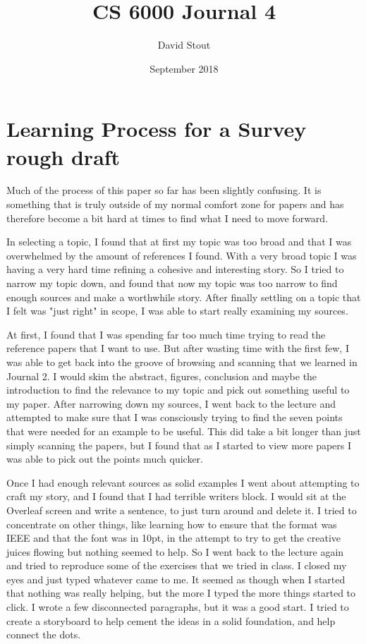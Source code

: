 \documentclass[10pt]{IEEEtran}
\title{CS 6000 Journal 4}
\author{David Stout}
\date{September 2018}
\begin{document}
\maketitle

\section{Learning Process for a Survey rough draft}
Much of the process of this paper so far has been slightly confusing. It is something that 
is truly outside of my normal comfort zone for papers and has therefore become a bit hard at
times to find what I need to move forward.

In selecting a topic, I found that at first my topic was too broad and that I was 
overwhelmed by the amount of references I found. With a very broad topic I was having a very
hard time refining a cohesive and interesting story. So I tried to narrow my topic down, and
found that now my topic was too narrow to find enough sources and make a worthwhile story. 
After finally settling on a topic that I felt was "just right" in scope, I was able to start
really examining my sources.

At first, I found that I was spending far too much time trying to read the reference papers 
that I want to use. But after wasting time with the first few, I was able to get back into 
the groove of browsing and scanning that we learned in Journal 2. I would skim the abstract,
figures, conclusion and maybe the introduction to find the relevance to my topic and pick 
out something useful to my paper. After narrowing down my sources, I went back to the 
lecture and attempted to make sure that I was consciously trying to find the seven points 
that were needed for an example to be useful. This did take a bit longer than just simply 
scanning the papers, but I found that as I started to view more papers I was able to pick 
out the points much quicker.

Once I had enough relevant sources as solid examples I went about attempting to craft my 
story, and I found that I had terrible writers block. I would sit at the Overleaf screen and
write a sentence, to just turn around and delete it. I tried to concentrate on other things,
like learning how to ensure that the format was IEEE and that the font was in 10pt, in the 
attempt to try to get the creative juices flowing but nothing seemed to help. So I went back
to the lecture again and tried to reproduce some of the exercises that we tried in class. I 
closed my eyes and just typed whatever came to me. It seemed as though when I started that 
nothing was really helping, but the more I typed the more things started to click. I wrote a
few disconnected paragraphs, but it was a good start. I tried to create a storyboard to help
cement the ideas in a solid foundation, and help connect the dots.
\end{document}
